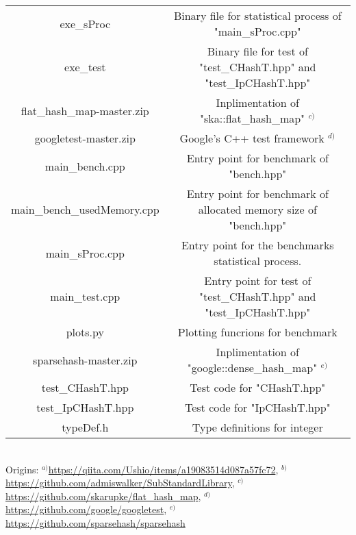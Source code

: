 \begin{table}[h]
\begin{center}
\begin{tabular}{cc}
      exe\_sProc                 & Binary file for statistical process of "main\_sProc.cpp"              \\
      exe\_test                  & Binary file for test of "test\_CHashT.hpp" and "test\_IpCHashT.hpp"   \\
      flat\_hash\_map-master.zip & Inplimentation of "ska::flat\_hash\_map" $^{c)}$                       \\
      googletest-master.zip      & Google's C++ test framework $^{d)}$                                    \\
      main\_bench.cpp            & Entry point for benchmark of "bench.hpp"                              \\
      main\_bench\_usedMemory.cpp & Entry point for benchmark of allocated memory size of "bench.hpp"    \\
      main\_sProc.cpp            & Entry point for the benchmarks statistical process.                   \\
      main\_test.cpp             & Entry point for test of "test\_CHashT.hpp" and "test\_IpCHashT.hpp"   \\
      plots.py                   & Plotting funcrions for benchmark                                      \\
      sparsehash-master.zip      & Inplimentation of "google::dense\_hash\_map" $^{e)}$                   \\
      test\_CHashT.hpp           & Test code for "CHashT.hpp"                                            \\
      test\_IpCHashT.hpp         & Test code for "IpCHashT.hpp"                                          \\
      typeDef.h                  & Type definitions for integer                                          \\ \hline
    \end{tabular}
    \label{table_fileDesc}\\
    Origins: $^{a)}$\url{https://qiita.com/Ushio/items/a19083514d087a57fc72}, 
    $^{b)}$\url{https://github.com/admiswalker/SubStandardLibrary}, 
    $^{c)}$\url{https://github.com/skarupke/flat_hash_map}, 
    $^{d)}$\url{https://github.com/google/googletest},
    $^{e)}$\url{https://github.com/sparsehash/sparsehash}\\
  \end{center}
\end{table}

